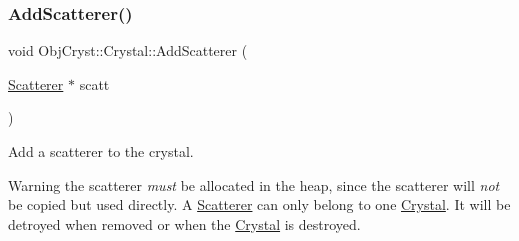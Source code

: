 \subsubsection{\texorpdfstring{AddScatterer()}{AddScatterer()}}
{\footnotesize\ttfamily void Obj\+Cryst\+::\+Crystal\+::\+Add\+Scatterer (\begin{DoxyParamCaption}\item[{\mbox{\hyperlink{class_obj_cryst_1_1_scatterer}{Scatterer}} $\ast$}]{scatt }\end{DoxyParamCaption})}



Add a scatterer to the crystal. 

\begin{DoxyWarning}{Warning}
the scatterer {\itshape must} be allocated in the heap, since the scatterer will {\itshape not} be copied but used directly. A \mbox{\hyperlink{class_obj_cryst_1_1_scatterer}{Scatterer}} can only belong to one \mbox{\hyperlink{class_obj_cryst_1_1_crystal}{Crystal}}. It will be detroyed when removed or when the \mbox{\hyperlink{class_obj_cryst_1_1_crystal}{Crystal}} is destroyed. 
\end{DoxyWarning}

